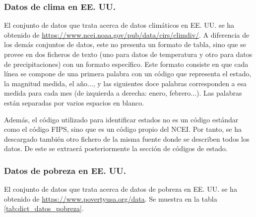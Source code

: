 \documentclass[11pt,a4paper]{article}
\begin{document}
\subsubsection*{Datos de clima en EE. UU.}

El conjunto de datos que trata acerca de datos climáticos en EE. UU. se ha obtenido de \url{https://www.ncei.noaa.gov/pub/data/cirs/climdiv/}. A diferencia de los demás conjuntos de datos, este no presenta un formato de tabla, sino que se provee en dos ficheros de texto (uno para datos de temperatura y otro para datos de precipitaciones) con un formato específico. Este formato consiste en que cada línea se compone de una primera palabra con un código que representa el estado, la magnitud medida, el año..., y las siguientes doce palabras corresponden a esa medida para cada mes (de izquierda a derecha: enero, febrero...). Las palabras están separadas por varios espacios en blanco.

Además, el código utilizado para identificar estados no es un código estándar como el código FIPS, sino que es un código propio del NCEI. Por tanto, se ha descargado también otro fichero de la misma fuente donde se describen todos los datos. De este se extraerá posteriormente la sección de códigos de estado.

\subsubsection*{Datos de pobreza en EE. UU.}

El conjunto de datos que trata acerca de datos de pobreza en EE. UU. se ha obtenido de \url{https://www.povertyusa.org/data}. Se muestra en la tabla \ref{tab:dict_datos_pobreza}.
\end{document}
